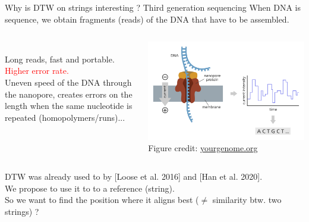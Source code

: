 \begin{frame}{Why is DTW on strings interesting ? Third generation sequencing}
    \small
    When DNA is sequence, we obtain fragments (reads) of the DNA that have to be assembled.\pause
    \begin{columns}
    \smallskip
    \\
    \smallskip
    \textcolor{mygreen}{Long reads, fast and portable.}\\
    \smallskip
    \textcolor{red}{Higher error rate.}\\
    \smallskip
    Uneven speed of the DNA through the nanopore, creates errors on the length when the same nucleotide is repeated (homopolymers/runs)...
    \begin{center}
    \includegraphics[scale=0.20]{figures/ont-sequencing_yourgenome.png}\\
    {\tiny Figure credit: \href{https://www.yourgenome.org/facts/what-is-oxford-nanopore-technology-ont-sequencing/}{yourgenome.org}}
    \end{center}
    
    \end{columns}\pause
    \vfill
    { DTW  was already used to  by [Loose et al. 2016] and [Han et al. 2020].\\ \pause
    We propose to use it to  to a reference (string).\\ \pause
    So we want to find the position where it aligns best ($\neq$ similarity btw. two strings) ?}
    
\end{frame}

